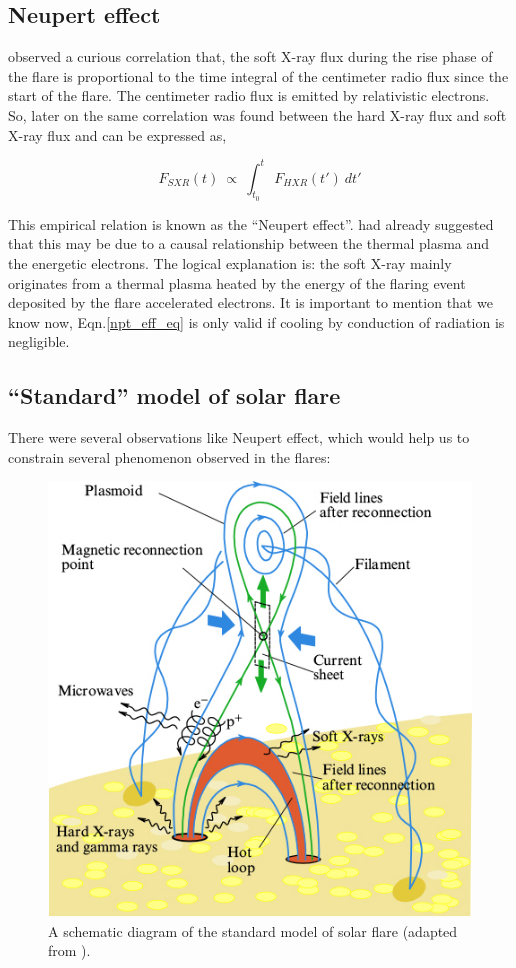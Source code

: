 \subsection{Neupert effect}\label{npt_eff}

\cite{neupert68} observed a curious correlation that, the soft X-ray flux during the rise phase of the flare is proportional to the time integral of the centimeter radio flux since the start of the flare. The centimeter radio flux is emitted by relativistic electrons. So, later on the same correlation was found between the hard X-ray flux and soft X-ray flux and can be expressed as,

\begin{equation}\label{npt_eff_eq}
    F_{SXR}(t)~\propto~\int_{t_{0}}^{t}~F_{HXR}(t')~dt'
\end{equation}

This empirical relation is known as the ``Neupert effect''. \cite{neupert68} had already suggested that this may be due to a causal relationship between the thermal plasma and the energetic electrons. The logical explanation is: the soft X-ray mainly originates from a thermal plasma heated by the energy of the flaring event deposited by the flare accelerated electrons. It is important to mention that we know now, Eqn.\ref{npt_eff_eq} is only valid if cooling by conduction of radiation is negligible.

\subsection{``Standard'' model of solar flare}\label{sol_flr_std_mod}

There were several observations like Neupert effect, which would help us to constrain several phenomenon observed in the flares:

\begin{figure}[h!]
    \centering
    \includegraphics[width=0.5\linewidth]{Figures/phu_63_8_818_f2.jpg}
    \caption{A schematic diagram of the standard model of solar flare (adapted from \cite{lysenko20}).}
\end{figure}

